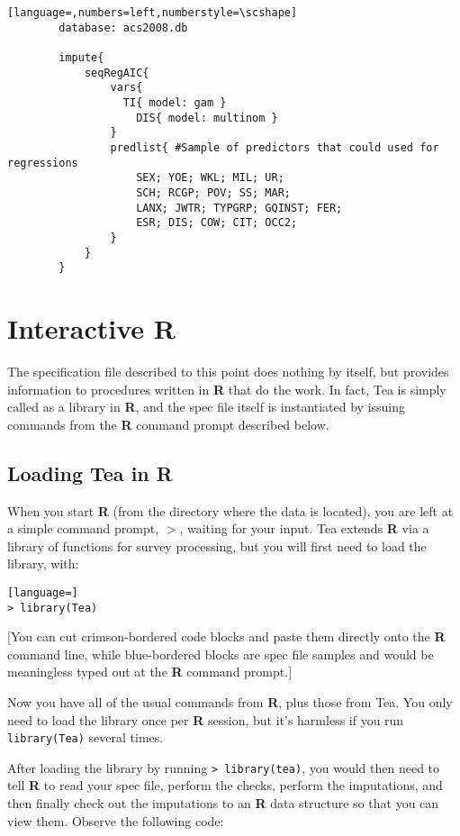 \documentclass{article}
\begin{document}
        \begin{lstlisting}[language=,numbers=left,numberstyle=\scshape]
        database: acs2008.db

        impute{
            seqRegAIC{
                vars{
                  TI{ model: gam }
                    DIS{ model: multinom }
                }
                predlist{ #Sample of predictors that could used for regressions
                    SEX; YOE; WKL; MIL; UR;
                    SCH; RCGP; POV; SS; MAR;
                    LANX; JWTR; TYPGRP; GQINST; FER;
                    ESR; DIS; COW; CIT; OCC2;
                }
            }
        }

        \end{lstlisting}


\section{Interactive R}
The specification file described to this point does nothing by itself, but provides
information to procedures written in \textbf{R} that do the work. In fact, Tea is simply 
called as a library in \textbf{R}, and the spec file itself is instantiated by 
issuing commands from the \textbf{R} command prompt described below.

\subsection{Loading Tea in R}
When you start \textbf{R} (from the directory where the data is located), you are left at a
simple command prompt, $>$, waiting for your input. Tea extends \textbf{R} via a library of
functions for survey processing, but you will first need to load the library, with:
\begin{lstlisting}[language=]
> library(Tea)
\end{lstlisting}

[You can cut crimson-bordered code blocks and paste them directly onto the \textbf{R}
command line, while blue-bordered blocks are spec file samples and
would be meaningless typed out at the \textbf{R} command prompt.]

Now you have all of the usual commands from \textbf{R}, plus those from Tea. You only
need to load the library once per \textbf{R} session, but it's harmless if you run
{\tt library(Tea)} several times.

After loading the library by running {\tt > library(tea)}, you would then need to 
tell \textbf{R} to read your spec file, perform the checks, perform the imputations, 
and then finally check out the imputations to an \textbf{R} data structure so that you 
can view them. Observe the following code:
\end{document}
